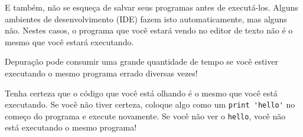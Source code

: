 E também, não se esqueça de salvar seus programas antes de executá-los.
Alguns ambientes de desenvolvimento (IDE) fazem isto automaticamente, mas
alguns não. Nestes casos, o programa que você estará vendo no editor de texto
não é o mesmo que você estará executando.


Depuração pode consumir uma grande quantidade de tempo se você estiver
executando o mesmo programa errado diversas vezes!


Tenha certeza que o código que você está olhando é o mesmo que você está
executando. Se você não tiver certeza, coloque algo como um \verb"print 'hello'"
no começo do programa e execute novamente. Se você não ver o \verb"hello",
você não está executando o mesmo programa!


